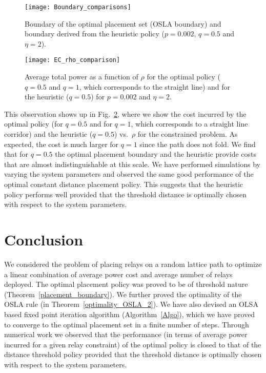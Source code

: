\documentclass[conference]{IEEEtran}
\begin{document}
\begin{figure}[t!]
\centering
\texttt{[image: Boundary\_comparisons]}
\caption{Boundary of the optimal placement set (OSLA boundary) and boundary derived from the 
heuristic policy ($p=0.002$, $q=0.5$ and $\eta=2$). }
\label{boundary_comparisons_figure}
\vspace{-4mm}
\end{figure}

\begin{figure}[t]
\centering
\texttt{[image: EC\_rho\_comparison]}
\caption{Average total power as a function of $\rho$ for the optimal policy ($q=0.5$ and $q=1$, 
which corresponds to the straight line) and for the heuristic ($q=0.5$) for $p=0.002$ and 
$\eta=2$.}
\label{EC_rho_comparison_figure}
\vspace{-6mm}
\end{figure}

This observation shows up in Fig.~\ref{EC_rho_comparison_figure}, where we show the cost 
incurred by the optimal policy (for $q=0.5$ and for $q=1$, which corresponds to a straight line 
corridor) and the heuristic ($q=0.5$) vs.\ $\rho$ for the constrained problem. As expected, the 
cost is much larger for $q=1$ since the path does not fold. We find that for $q=0.5$ the 
optimal placement boundary and the heuristic provide costs that are almost indistinguishable at 
this scale. We have performed simulations by varying the system parameters and observed the 
same good performance of the optimal constant distance placement policy. This suggests that the 
heuristic policy performs well provided that the threshold distance is optimally chosen with 
respect to the system parameters. 

\section{Conclusion}
We considered the problem of placing relays on a random lattice path
to optimize a linear combination of average power cost and average
number of relays deployed. The optimal placement policy was proved to
be of threshold nature (Theorem~\ref{placement_boundary}).  We further
proved the optimality of the OSLA rule (in
Theorem~\ref{optimality_OSLA_2}).  We have also devised an OLSA based
fixed point iteration algorithm (Algorithm~\ref{Algo}), which we have
proved to converge to the optimal placement set in a finite number of
steps.  Through numerical work we observed that the performance (in
terms of average power incurred for a given relay constraint) of the
optimal policy is closed to that of the distance threshold policy
provided that the threshold distance is optimally chosen with respect
to the system parameters.
\end{document}
